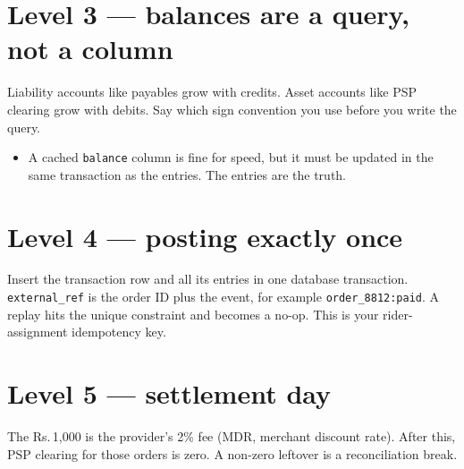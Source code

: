 \documentclass[10pt,a4paper]{article}
\begin{document}
\section{Level 3 — balances are a query, not a column}
Liability accounts like payables grow with credits. Asset accounts like PSP clearing grow with debits. Say which sign convention you use before you write the query.
\begin{itemize}
  \item A cached \texttt{balance} column is fine for speed, but it must be updated in the same transaction as the entries. The entries are the truth.
\end{itemize}

\section{Level 4 — posting exactly once}
Insert the transaction row and all its entries in one database transaction. \texttt{external\_ref} is the order ID plus the event, for example \texttt{order\_8812:paid}. A replay hits the unique constraint and becomes a no-op. \K This is your rider-assignment idempotency key.

\section{Level 5 — settlement day}
The Rs.\,1,000 is the provider's 2\% fee (MDR, merchant discount rate). After this, PSP clearing for those orders is zero. A non-zero leftover is a reconciliation break.
\end{document}
